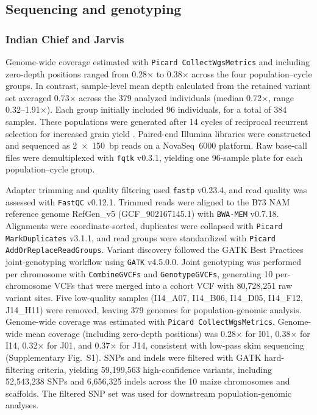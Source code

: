 \subsection{Sequencing and genotyping}

\subsubsection{Indian Chief and Jarvis}

Genome-wide coverage estimated with \texttt{Picard CollectWgsMetrics} and including zero-depth positions ranged from 0.28$\times$ to 0.38$\times$ across the four population--cycle groups. In contrast, sample-level mean depth calculated from the retained variant set averaged 0.73$\times$ across the 379 analyzed individuals (median 0.72$\times$, range 0.32--1.91$\times$). Each group initially included 96 individuals, for a total of 384 samples. These populations were generated after 14 cycles of reciprocal recurrent selection for increased grain yield \citep{Moll1994}. Paired-end Illumina libraries were constructed and sequenced as 2~$\times$~150~bp reads on a NovaSeq~6000 platform. Raw base-call files were demultiplexed with \texttt{fqtk} v0.3.1, yielding one 96-sample plate for each population--cycle group.

Adapter trimming and quality filtering used \texttt{fastp} v0.23.4, and read quality was assessed with \texttt{FastQC} v0.12.1. Trimmed reads were aligned to the B73 NAM reference genome RefGen\_v5 (GCF\_902167145.1) with \texttt{BWA-MEM} v0.7.18. Alignments were coordinate-sorted, duplicates were collapsed with \texttt{Picard MarkDuplicates} v3.1.1, and read groups were standardized with \texttt{Picard AddOrReplaceReadGroups}. Variant discovery followed the GATK Best Practices joint-genotyping workflow using \texttt{GATK} v4.5.0.0. Joint genotyping was performed per chromosome with \texttt{CombineGVCFs} and \texttt{GenotypeGVCFs}, generating 10 per-chromosome VCFs that were merged into a cohort VCF with 80,728,251 raw variant sites. Five low-quality samples (I14\_A07, I14\_B06, I14\_D05, I14\_F12, J14\_H11) were removed, leaving 379 genomes for population-genomic analysis. Genome-wide coverage was estimated with \texttt{Picard CollectWgsMetrics}. Genome-wide mean coverage (including zero-depth positions) was 0.28× for I01, 0.38× for I14, 0.32× for J01, and 0.37× for J14, consistent with low-pass skim sequencing (Supplementary Fig.~S1). SNPs and indels were filtered with GATK hard-filtering criteria, yielding 59,199,563 high-confidence variants, including 52,543,238 SNPs and 6,656,325 indels across the 10 maize chromosomes and scaffolds. The filtered SNP set was used for downstream population-genomic analyses.


